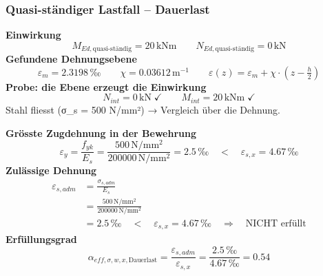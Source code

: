 \documentclass[11pt,a4paper]{article}
\begin{document}
\subsubsection{Quasi-ständiger Lastfall – Dauerlast}
\noindent\textbf{Einwirkung}
\begin{equation*}
M_{Ed,\text{quasi-ständig}} = 20\,\mathrm{kNm} \qquad N_{Ed,\text{quasi-ständig}} = 0\,\mathrm{kN}
\end{equation*}
\noindent\textbf{Gefundene Dehnungsebene}
\begin{equation*}
\varepsilon_m = 2.3198\,\text{‰} \qquad \chi = 0.03612\,\mathrm{m}^{-1} \qquad \varepsilon(z) = \varepsilon_m + \chi \cdot \left(z - \tfrac{h}{2}\right)
\end{equation*}
\noindent\textbf{Probe: die Ebene erzeugt die Einwirkung}
\begin{equation*}
N_{int} = 0\,\mathrm{kN} \;\checkmark \qquad M_{int} = 20\,\mathrm{kNm} \;\checkmark
\end{equation*}
Stahl fliesst (σ\_s = 500 N/mm²) → Vergleich über die Dehnung.

\noindent\textbf{Grösste Zugdehnung in der Bewehrung}
\begin{equation*}
\varepsilon_y = \frac{f_{yk}}{E_s} = \frac{500\,\mathrm{N}/\mathrm{mm}^{2}}{200000\,\mathrm{N}/\mathrm{mm}^{2}} = 2.5\,\text{‰} \quad < \quad \varepsilon_{s,x} = 4.67\,\text{‰}
\end{equation*}
\noindent\textbf{Zulässige Dehnung}
\begin{equation*}
\begin{aligned}
  \varepsilon_{s,adm} &= \frac{\sigma_{s,adm}}{E_s} \\
  &= \frac{500\,\mathrm{N}/\mathrm{mm}^{2}}{200000\,\mathrm{N}/\mathrm{mm}^{2}} \\
  &= 2.5\,\text{‰} \quad < \quad \varepsilon_{s,x} = 4.67\,\text{‰} \quad \Rightarrow \quad \text{NICHT erfüllt}
\end{aligned}
\end{equation*}
\noindent\textbf{Erfüllungsgrad}
\begin{equation*}
\alpha_{eff,\sigma,w,x,\text{Dauerlast}} = \frac{\varepsilon_{s,adm}}{\varepsilon_{s,x}} = \frac{2.5\,\text{‰}}{4.67\,\text{‰}} = 0.54
\end{equation*}
\end{document}
